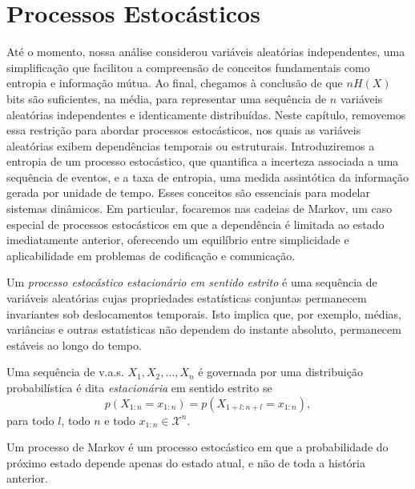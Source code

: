 

\chapter{Processos Estocásticos}\label{cht:processosestocasticos}

Até o momento, nossa análise considerou variáveis aleatórias independentes, uma
simplificação que facilitou a compreensão de conceitos fundamentais como
entropia e informação mútua. Ao final, chegamos à conclusão de que $nH(X)$ bits são
suficientes, na média, para representar uma sequência de $n$ variáveis aleatórias
independentes e identicamente distribuídas. Neste capítulo, removemos essa restrição para
abordar processos estocásticos, nos quais as variáveis aleatórias exibem
dependências temporais ou estruturais. Introduziremos a entropia de um processo
estocástico, que quantifica a incerteza associada a uma sequência de eventos, e
a taxa de entropia, uma medida assintótica da informação gerada por unidade de
tempo. Esses conceitos são essenciais para modelar sistemas dinâmicos. Em
particular, focaremos nas cadeias de Markov, um caso especial de processos
estocásticos em que a dependência é limitada ao estado imediatamente anterior,
oferecendo um equilíbrio entre simplicidade e aplicabilidade em problemas de
codificação e comunicação.

Um \emph{processo estocástico estacionário em sentido estrito} é uma sequência de
variáveis aleatórias cujas propriedades estatísticas conjuntas permanecem
invariantes sob deslocamentos temporais. Isto implica que, por exemplo, médias,
variâncias e outras estatísticas não dependem do instante absoluto, permanecem
estáveis ao longo do tempo.

\begin{definition}
  Uma sequência de v.a.s. $X_1, X_2, \ldots, X_n$ é governada por uma distribuição probabilística é dita
  \emph{estacionária} em sentido estrito se
  \begin{equation}
  p(X_{1:n} = x_{1:n}) = p(X_{1+l:n+l} = x_{1:n}) ,
  \end{equation}
  para todo $l$, todo $n$ e todo $x_{1:n} \in \mathcal{X}^n$.
\end{definition}

Um processo de Markov é um processo estocástico em que a probabilidade do
próximo estado depende apenas do estado atual, e não de toda a história
anterior.

